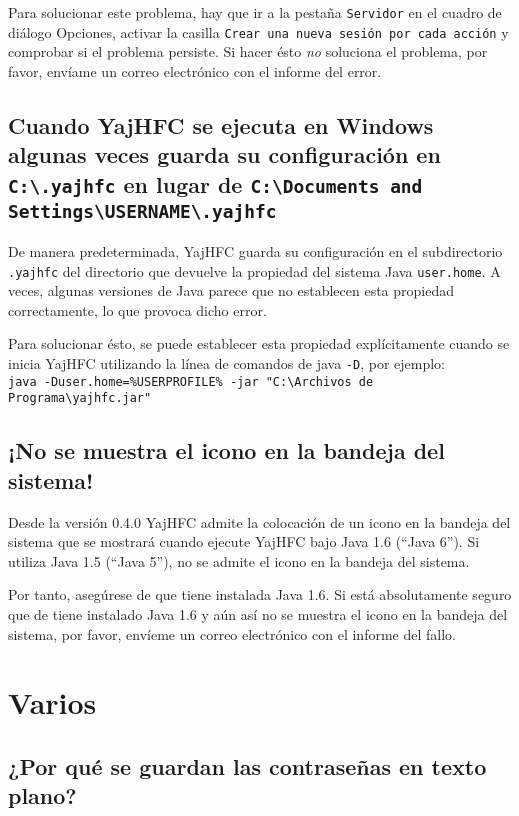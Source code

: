 \documentclass[a4paper,10pt]{scrartcl}
\begin{document}
Para solucionar este problema, hay que ir a la pestaña \texttt{Servidor} en el cuadro de diálogo Opciones, activar la casilla \texttt{Crear una nueva sesión por cada acción} y comprobar si el problema persiste.
Si hacer ésto \emph{no} soluciona el problema, por favor, envíame un correo electrónico con el informe del error.

\subsection{Cuando YajHFC se ejecuta en Windows algunas veces guarda su configuración en \texttt{C:\textbackslash .yajhfc} en lugar de \texttt{C:\textbackslash Documents and Settings\textbackslash USERNAME\textbackslash .yajhfc}}

De manera predeterminada, YajHFC guarda su configuración en el subdirectorio \texttt{.yajhfc} del directorio que devuelve
la propiedad del sistema Java \texttt{user.home}.
A veces, algunas versiones de Java parece que no establecen esta propiedad correctamente, lo que provoca dicho error.

Para solucionar ésto, se puede establecer esta propiedad explícitamente cuando se inicia YajHFC utilizando la línea de comandos de java \texttt{-D}, por ejemplo:\\
\texttt{java -Duser.home=\%USERPROFILE\% -jar "C:\textbackslash Archivos de Programa\textbackslash yajhfc.jar"}

\subsection{¡No se muestra el icono en la bandeja del sistema!}

Desde la versión 0.4.0 YajHFC admite la colocación de un icono en la bandeja del sistema que se mostrará cuando ejecute YajHFC bajo Java 1.6 (``Java 6'').
Si utiliza Java 1.5 (``Java 5''), no se admite el icono en la bandeja del sistema.

Por tanto, asegúrese de que tiene instalada Java 1.6. Si está absolutamente seguro que de tiene instalado Java 1.6 y aún así no se muestra el icono en la bandeja del sistema, por favor, envíeme un correo electrónico con el informe del fallo.


\section{Varios}

\subsection{¿Por qué se guardan las contraseñas en texto plano?}
\end{document}
